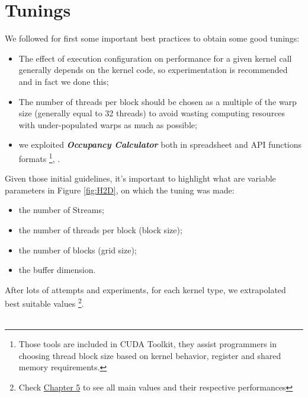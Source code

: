 		 
\section{Tunings}
	
	We followed for first some important best practices to obtain some good tunings:

	\begin{itemize}
		\item The effect of execution configuration on performance for a given kernel call generally
		depends on the kernel code, so experimentation is recommended and in fact we done this;
		\item The number of threads per block should be chosen as a multiple of the warp size (generally equal to 32 threads) to
		avoid wasting computing resources with under-populated warps as much as possible;
		\item we exploited \textbf{\textit{Occupancy Calculator}} both in spreadsheet and API functions formats \footnote{Those tools are included in CUDA Toolkit, they assist programmers in choosing thread block size based on kernel behavior, register and shared memory requirements.}, \cite{cudaguide}.
		 
	\end{itemize}

	Given those initial guidelines, it's important to highlight what are variable parameters in Figure \ref{fig:H2D}, on which the tuning was made:
	\begin{itemize}
		\item the number of Streams;
		\item the number of threads per block (block size);
		\item the number of blocks (grid size);
		\item the buffer dimension.
	\end{itemize}
	
	After lots of attempts and experiments, for each kernel type, we extrapolated best suitable values \footnote{Check \hyperref[chap:experim]{Chapter 5} to see all main values and their respective performances }.\\\\
	


